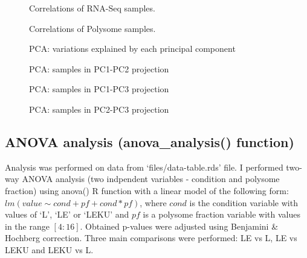 \documentclass[12pt]{article} %
\begin{document}
\begin{figure}[H] %
\caption{Correlations of RNA-Seq samples.}
\label{fig:rna-seq-correlations}
\end{figure}

\begin{figure}[H] %
\caption{Correlations of Polysome samples.}
\label{fig:polysome-correlations}
\end{figure}

\begin{figure}[H] %
\caption{PCA: variations explained by each principal component}
\label{fig:pca}
\end{figure}

\begin{figure}[H] %
\caption{PCA: samples in PC1-PC2 projection}
\label{fig:pca12}
\end{figure}

\begin{figure}[H] %
\caption{PCA: samples in PC1-PC3 projection}
\label{fig:pca13}
\end{figure}

\begin{figure}[H] %
\caption{PCA: samples in PC2-PC3 projection}
\label{fig:pca23}
\end{figure}



\subsection{ANOVA analysis (anova\_analysis() function)} %
Analysis was performed on data from `files/data-table.rds' file. I performed two-way ANOVA analysis (two indpendent variables - condition and polysome fraction) using anova() R function with a linear model of the following form: $lm(value\sim cond+pf+cond*pf)$, where $cond$ is the condition variable with values of `L', `LE' or `LEKU' and $pf$ is a polysome fraction variable with values in the range $[4:16]$. Obtained p-values were adjusted using Benjamini \& Hochberg correction. Three main comparisons were performed: LE vs L, LE vs LEKU and LEKU vs L.
\end{document}
